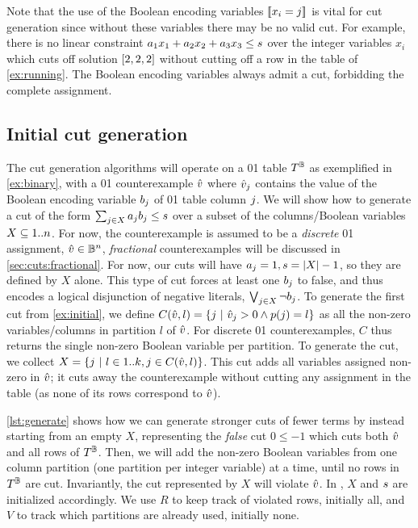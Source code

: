 \documentclass[a4paper,UKenglish,cleveref,autoref,thm-restate]{lipics-v2021}
\begin{document}
Note that the use of the Boolean encoding variables $[\![x_{i} = j]\!]$ is vital for cut generation since without these variables there may be no valid cut. 
For example, there is no linear constraint $a_1 x_1 + a_2 x_2 + a_3 x_3 \leq s$ over the integer variables $x_i$ which cuts off solution $[2,2,2]$ without cutting off a row in the table of \cref{ex:running}.
The Boolean encoding variables always admit a cut, \eg forbidding the complete assignment.

\subsection{Initial cut generation}
\label{sec:cuts:initial}

The cut generation algorithms will operate on a 01 table $T^{\mathbb{B}}$ as exemplified in \cref{ex:binary}, with a 01 counterexample $\hat{v}$ where $\hat{v}_j$ contains the value of the Boolean encoding variable $b_{j}$ of 01 table column $j$.
We will show how to generate a cut of the form $\sum_{j \in X} a_j b_j \leq s$ over a subset of the columns/Boolean variables $X \subseteq 1..n$.
For now, the counterexample is assumed to be a \textit{discrete} 01 assignment, $\hat{v} \in \mathbb{B}^n$, \textit{fractional} counterexamples will be discussed in \cref{sec:cuts:fractional}.
For now, our cuts will have $a_j=1, s=|X|-1$, so they are defined by $X$ alone.
This type of cut forces at least one $b_j$ to false, and thus encodes a logical disjunction of negative literals, $\bigvee_{j \in X} \neg b_j$.
To generate the first cut from \cref{ex:initial}, we define $C(\hat{v},l) = \{j ~|~ \hat{v}_j > 0 \wedge p(j) = l\}$ as all the non-zero variables/columns in partition $l$ of $\hat{v}$.
For discrete 01 counterexamples, $C$ thus returns the single non-zero Boolean variable per partition.
To generate the cut, we collect $X = \{j ~|~ l \in 1..k, j \in C(\hat{v}, l)\}$.
This cut adds all variables assigned non-zero in $\hat{v}$; it cuts away the counterexample without cutting any assignment in the table (as none of its rows correspond to $\hat{v}$).

\cref{lst:generate} shows how we can generate stronger cuts of fewer terms by instead starting from an empty $X$, representing the \textit{false} cut $0 \leq -1$ which cuts both $\hat{v}$ and all rows of $T^{\mathbb{B}}$.
Then, we will add the non-zero Boolean variables from one column partition (\ie one partition per integer variable) at a time, until no rows in $T^{\mathbb{B}}$ are cut.
Invariantly, the cut represented by $X$ will violate $\hat{v}$.
In , $X$ and $s$ are initialized accordingly.
We use $R$ to keep track of violated rows, initially all, and
 $V$ to track which partitions are already used, initially none.
\end{document}
